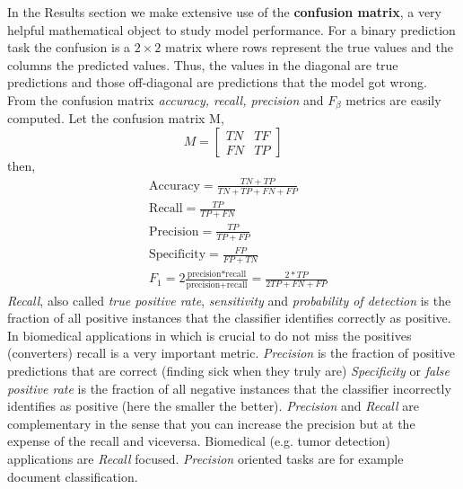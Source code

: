 \documentclass[11pt]{article}
\theoremstyle{definition}
\theoremstyle{remark}
\begin{document}
In the Results section we make extensive use of the \textbf{confusion matrix}, a very helpful mathematical object to study model performance. For a binary prediction task the confusion is a $2 \times 2$ matrix where rows represent the true values and the columns the predicted values. Thus, the values in the diagonal are true predictions and those off-diagonal are predictions that the model got wrong. From the confusion matrix \emph{accuracy, recall, precision} and $F_\beta$ metrics are easily computed.
Let the confusion matrix M,  
\begin{equation*}
M=
  \begin{bmatrix}
    TN & TF  \\
    FN & TP 
  \end{bmatrix}
\end{equation*}
then, 
\begin{equation*}
\begin{split}
&\text{Accuracy} = \frac{TN + TP}{TN+TP+FN+FP} \\
&\text{Recall} = \frac{TP}{TP+FN} \\
&\text{Precision} = \frac{TP}{TP+FP} \\
&\text{Specificity} = \frac{FP}{FP+TN} \\
&F_1 = 2\frac{\text{precision*recall}}{\text{precision}+\text{recall}} = \frac{2 * TP}{2TP + FN + FP}
\end{split}
\end{equation*}
\emph{Recall}, also called \emph{true positive rate}, \emph{sensitivity} and \emph{probability of detection} is the fraction of all positive instances that the classifier identifies correctly as positive. In biomedical applications in which is crucial to do not miss the positives (converters) recall is a very important metric.
\emph{Precision} is the fraction of positive predictions that are correct (finding sick when they truly are)
\emph{Specificity} or \emph{false positive rate} is the fraction of all negative instances that the classifier incorrectly identifies as positive (here the smaller the better).
\emph{Precision} and \emph{Recall} are complementary in the sense that you can increase the precision but at the expense of the recall and viceversa. Biomedical (e.g. tumor detection) applications are \emph{Recall} focused. \emph{Precision} oriented tasks are for example document classification. 
\end{document}

